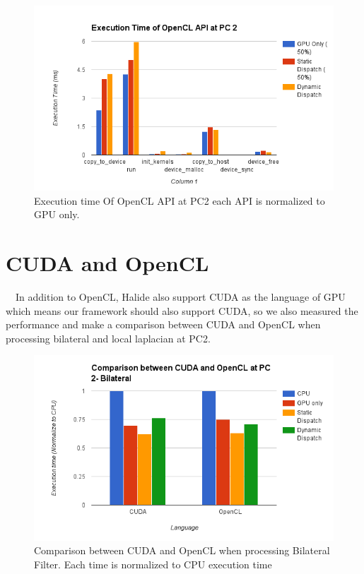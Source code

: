 \begin{figure}[!hbtp]
\centering
\includegraphics[width=12cm]{img/ExecutionTimeOfAPI(Bilateal@PC2).png}
\caption{Execution time Of OpenCL API at PC2 each API is normalized to GPU only.}
\label{fig:my_label}
\end{figure}

\section{CUDA and OpenCL}
\quad \  \ In addition to OpenCL, Halide also support CUDA as the language of GPU which means our framework should also support CUDA, so we also measured the performance and make a comparison between CUDA and OpenCL when processing bilateral and local laplacian at PC2.



\begin{figure}[hbtp]
\centering
\includegraphics[width=12cm]{img/ComparisonBetweenCUDAAndOpenCL(Bilateral).png}
\caption{Comparison between CUDA and OpenCL when processing Bilateral Filter. Each time is normalized to CPU execution time}
\label{fig:my_label}
\end{figure}

